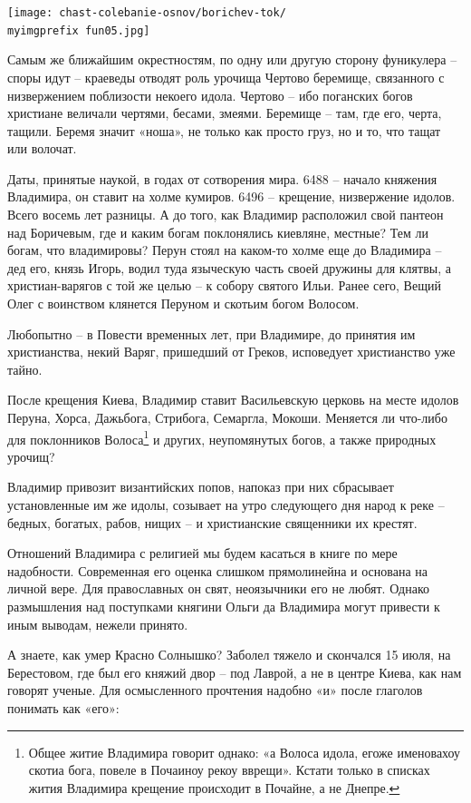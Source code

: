 \begin{center}
\texttt{[image: chast-colebanie-osnov/borichev-tok/\\myimgprefix fun05.jpg]}
\end{center}

Самым же ближайшим окрестностям, по одну или другую сторону фуникулера – споры идут – краеведы отводят роль урочища Чертово беремище, связанного с низвержением поблизости некоего идола. Чертово – ибо поганских богов христиане величали чертями, бесами, змеями. Беремище – там, где его, черта, тащили. Беремя значит «ноша», не только как просто груз, но и то, что тащат или волочат.

Даты, принятые наукой, в годах от сотворения мира. 6488 – начало княжения Владимира, он ставит на холме кумиров. 6496 – крещение, низвержение идолов. Всего восемь лет разницы. А до того, как Владимир расположил свой пантеон над Боричевым, где и каким богам поклонялись киевляне, местные? Тем ли богам, что владимировы? Перун стоял на каком-то холме еще до Владимира – дед его, князь Игорь, водил туда языческую часть своей дружины для клятвы, а христиан-варягов с той же целью – к собору святого Ильи. Ранее сего, Вещий Олег с воинством клянется Перуном и скотьим богом Волосом.

Любопытно – в Повести временных лет, при Владимире, до принятия им христианства, некий Варяг, пришедший от Греков, исповедует христианство уже тайно.

После крещения Киева, Владимир ставит Васильевскую церковь на месте идолов Перуна, Хорса, Дажьбога, Стрибога, Семаргла, Мокоши. Меняется ли что-либо для поклонников Волоса\footnote{Общее житие Владимира говорит однако: «а Волоса идола, егоже именовахоу скотиа бога, повеле в Почаиноу рекоу вврещи». Кстати только в списках жития Владимира крещение происходит в Почайне, а не Днепре.} и других, неупомянутых богов, а также природных урочищ?

Владимир привозит византийских попов, напоказ при них сбрасывает установленные им же идолы, созывает на утро следующего дня народ к реке – бедных, богатых, рабов, нищих – и христианские священники их крестят.
 
Отношений Владимира с религией мы будем касаться в книге по мере надобности. Современная его оценка слишком прямолинейна и основана на личной вере. Для православных он свят, неоязычники его не любят. Однако размышления над поступками княгини Ольги да Владимира могут привести к иным выводам, нежели принято.

А знаете, как умер Красно Солнышко? Заболел тяжело и скончался 15 июля, на Берестовом, где был его княжий двор – под Лаврой, а не в центре Киева, как нам говорят ученые. Для осмысленного прочтения надобно «и» после глаголов понимать как «его»:

